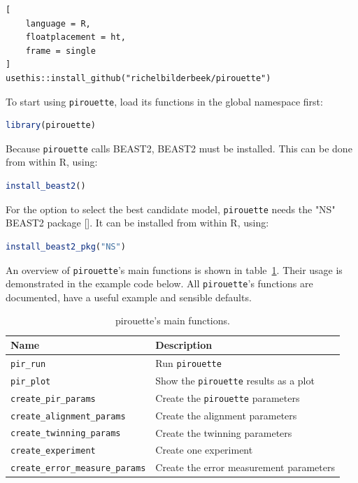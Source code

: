 \documentclass{article}
\begin{document}
\begin{lstlisting}[
    language = R,
    floatplacement = ht,
    frame = single
]
usethis::install_github("richelbilderbeek/pirouette")
\end{lstlisting}

To start using \verb;pirouette;, load its functions in the global namespace 
first:

\begin{lstlisting}[language=R, floatplacement=ht, frame=single]
library(pirouette)
\end{lstlisting}
Because \verb;pirouette; calls BEAST2, BEAST2 must be installed. 
This can be done from within R, using:

\begin{lstlisting}[language=R, floatplacement=ht, frame=single]
install_beast2()
\end{lstlisting}
For the option to select the best candidate model,
\verb;pirouette; needs the "NS" BEAST2 package [\cite{maturana2018model}].
It can be installed from within R, using:

\begin{lstlisting}[language=R, floatplacement=ht, frame=single]
install_beast2_pkg("NS")
\end{lstlisting}

An overview of \verb;pirouette;'s main functions is shown in 
table~\ref{tab:functions}. 
Their usage is demonstrated in the example code below.
All \verb;pirouette;'s functions are documented,
have a useful example and sensible defaults.

\begin{table}[h]
  \centering
  \begin{tabular}{ | l | l | }
    \hline
    \textbf{Name} & \textbf{Description} \\
    \hline
    \verb;pir_run; & Run \verb;pirouette; \\
    \verb;pir_plot; & Show the \verb;pirouette; results as a plot \\
    \verb;create_pir_params; & Create the \verb;pirouette; parameters \\
    \hline
    \verb;create_alignment_params; & Create the alignment parameters \\
    \verb;create_twinning_params; & Create the twinning parameters \\
    \verb;create_experiment; & Create one experiment \\
    \verb;create_error_measure_params; & Create the error measurement parameters \\
    \hline
  \end{tabular}
  \caption{pirouette's main functions.}
  \label{tab:functions}
\end{table}
\end{document}
